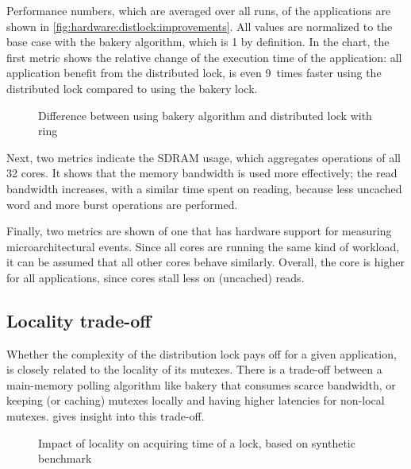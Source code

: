 Performance numbers, which are averaged over all runs, of the applications are shown in \vref{fig:hardware:distlock:improvements}.
All values are normalized to the base case with the bakery algorithm, which is 1 by definition.
In the chart, the first metric shows the relative change of the execution time of the application: all application benefit from the distributed lock,  is even 9~times faster using the distributed lock compared to using the bakery lock.

\begin{figure}%
%
\caption{Difference between using bakery algorithm and distributed lock with ring}%
\label{fig:hardware:distlock:improvements}%
\end{figure}

Next, two metrics indicate the \ac{SDRAM} usage, which aggregates operations of all 32 cores.
It shows that the memory bandwidth is used more effectively; the read bandwidth increases, with a similar time spent on reading, because less uncached word and more burst operations are performed.

Finally, two metrics are shown of one \MicroBlaze that has hardware support for measuring microarchitectural events.
Since all cores are running the same kind of workload, it can be assumed that all other cores behave similarly.
Overall, the core  is higher for all applications, since cores stall less on (uncached) reads.

\subsection{Locality trade-off}

Whether the complexity of the distribution lock pays off for a given application, is closely related to the locality of its mutexes.
There is a trade-off between a main-memory polling algorithm like bakery that consumes scarce bandwidth, or keeping (or caching) mutexes locally and having higher latencies for non-local mutexes.
 gives insight into this trade-off.

\begin{figure}%
%
\caption{Impact of locality on acquiring time of a lock, based on synthetic benchmark}%
\label{fig:hardware:distlock:migration}%
\end{figure}

